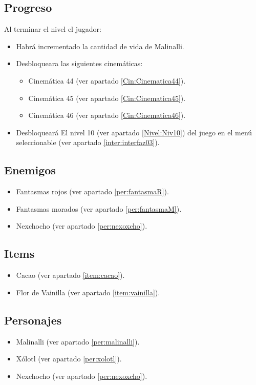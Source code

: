 	\subsection{Progreso}
		Al terminar el nivel el jugador:
\begin{itemize}
        \item Habrá incrementado la cantidad de vida de Malinalli. 
        \item Desbloqueara las siguientes cinemáticas:
\begin{itemize}
        \item Cinemática 44 (ver apartado \ref{Cin:Cinematica44}). 
        \item Cinemática 45 (ver apartado \ref{Cin:Cinematica45}).
        \item Cinemática 46 (ver apartado \ref{Cin:Cinematica46}).
\end{itemize}
        \item Desbloqueará El nivel 10 (ver apartado  \ref{Nivel:Niv10}) del juego en el menú seleccionable (ver apartado \ref{inter:interfaz03}). 
 \end{itemize}
	\subsection{Enemigos}
	\begin{itemize}
		\item Fantasmas rojos (ver apartado \ref{per:fantasmaR}).
		
		\item Fantasmas morados (ver apartado \ref{per:fantasmaM}).
		
		\item Nexchocho (ver apartado \ref{per:nexoxcho}).
	\end{itemize}
	\subsection{Items}
\begin{itemize}
        \item   Cacao (ver apartado \ref{item:cacao}).
        \item Flor de Vainilla (ver apartado \ref{item:vainilla}).
\end{itemize}
	\subsection{Personajes}
	\begin{itemize}
		\item Malinalli (ver apartado \ref{per:malinalli}).

		\item Xólotl (ver apartado \ref{per:xolotl}).
		
		\item Nexchocho (ver apartado \ref{per:nexoxcho}).
		
	\end{itemize}
